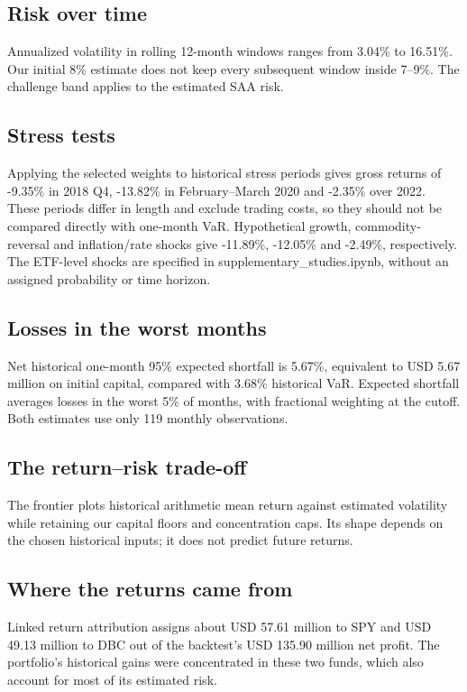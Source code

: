 \documentclass[10pt,a4paper]{article}
\begin{document}
\subsection{Risk over time}
Annualized volatility in rolling 12-month windows ranges from 3.04\% to 16.51\%. Our initial 8\% estimate does not keep every subsequent window inside 7--9\%. The challenge band applies to the estimated SAA risk.

\subsection{Stress tests}
Applying the selected weights to historical stress periods gives gross returns of -9.35\% in 2018 Q4, -13.82\% in February--March 2020 and -2.35\% over 2022. These periods differ in length and exclude trading costs, so they should not be compared directly with one-month VaR. Hypothetical growth, commodity-reversal and inflation/rate shocks give -11.89\%, -12.05\% and -2.49\%, respectively. The ETF-level shocks are specified in supplementary\_studies.ipynb, without an assigned probability or time horizon.

\subsection{Losses in the worst months}
Net historical one-month 95\% expected shortfall is 5.67\%, equivalent to USD 5.67 million on initial capital, compared with 3.68\% historical VaR. Expected shortfall averages losses in the worst 5\% of months, with fractional weighting at the cutoff. Both estimates use only 119 monthly observations.

\subsection{The return--risk trade-off}
The frontier plots historical arithmetic mean return against estimated volatility while retaining our capital floors and concentration caps. Its shape depends on the chosen historical inputs; it does not predict future returns.

\subsection{Where the returns came from}
Linked return attribution assigns about USD 57.61 million to SPY and USD 49.13 million to DBC out of the backtest's USD 135.90 million net profit. The portfolio's historical gains were concentrated in these two funds, which also account for most of its estimated risk.
\end{document}
